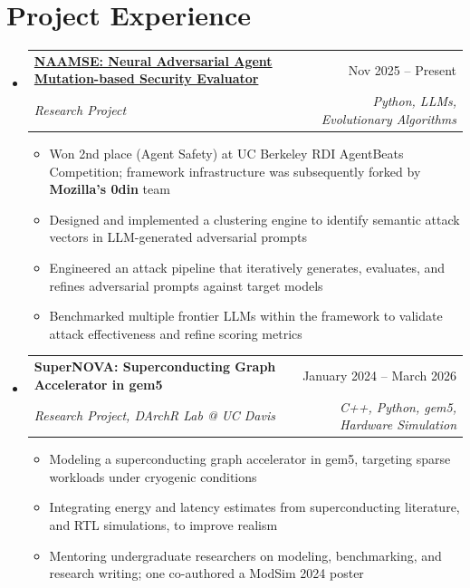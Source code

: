 \documentclass[letterpaper,10pt]{article}
\makeatletter
\newcommand{\resumeItem}[1]{\item\small{#1} \vspace{-3pt}}
\newcommand{\resumeSubheading}[4]{%
  \vspace{-1pt}\item
  \begin{tabular*}{0.97\textwidth}[t]{l@{\extracolsep{\fill}}r}
    \textbf{#1} & #2 \\
    \textit{#3} & \textit{#4} \\
  \end{tabular*}\vspace{-7pt}}
\newcommand{\resumeSubHeadingList}{\begin{itemize}[leftmargin=0.15in, label={}, labelsep=0.15in]}
\newcommand{\resumeJustifiedList}{\begin{itemize}[leftmargin=0.3in, label=\textbullet, labelsep=0.1in]}
\newcommand{\resumeSubHeadingListEnd}{\end{itemize}}
\makeatother
\begin{document}
\section{Project Experience}
{\normalsize
\resumeSubHeadingList
  \resumeSubheading{\href{https://naamse.com}{NAAMSE: Neural Adversarial Agent Mutation-based Security Evaluator}}{Nov 2025 -- Present}{Research Project}{Python, LLMs, Evolutionary Algorithms}
  \resumeJustifiedList
    \resumeItem{Won 2nd place (Agent Safety) at UC Berkeley RDI AgentBeats Competition; framework infrastructure was subsequently forked by \textbf{Mozilla's 0din} team}
    \resumeItem{Designed and implemented a clustering engine to identify semantic attack vectors in LLM-generated adversarial prompts}
    \resumeItem{Engineered an attack pipeline that iteratively generates, evaluates, and refines adversarial prompts against target models}
    \resumeItem{Benchmarked multiple frontier LLMs within the framework to validate attack effectiveness and refine scoring metrics}
  \end{itemize}
  \resumeSubheading{SuperNOVA: Superconducting Graph Accelerator in gem5}{January 2024 -- March 2026}{Research Project, DArchR Lab @ UC Davis}{C++, Python, gem5, Hardware Simulation}
  \resumeJustifiedList
    \resumeItem{Modeling a superconducting graph accelerator in gem5, targeting sparse workloads under cryogenic conditions}
    \resumeItem{Integrating energy and latency estimates from superconducting literature, and RTL simulations, to improve realism}
    \resumeItem{Mentoring undergraduate researchers on modeling, benchmarking, and research writing; one co-authored a ModSim 2024 poster}
  \end{itemize}
\resumeSubHeadingListEnd
}
\end{document}
